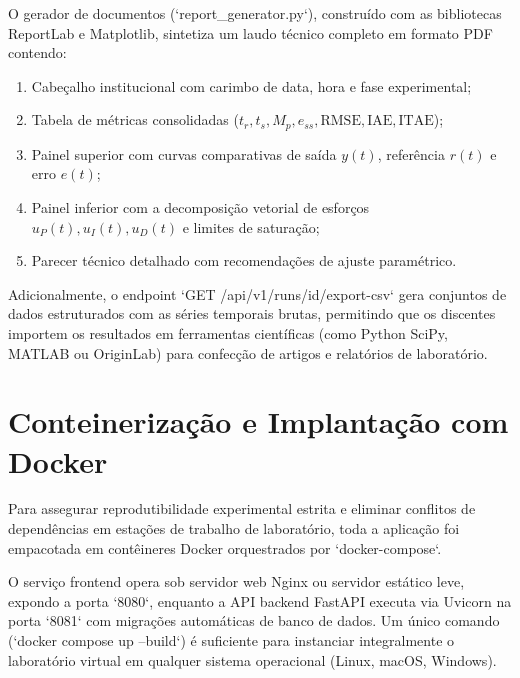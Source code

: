 O gerador de documentos (`report_generator.py`), construído com as bibliotecas ReportLab e Matplotlib, sintetiza um laudo técnico completo em formato PDF contendo:
\begin{enumerate}[label=\alph*)]
    \item Cabeçalho institucional com carimbo de data, hora e fase experimental;
    \item Tabela de métricas consolidadas ($t_r, t_s, M_p, e_{ss}, \text{RMSE}, \text{IAE}, \text{ITAE}$);
    \item Painel superior com curvas comparativas de saída $y(t)$, referência $r(t)$ e erro $e(t)$;
    \item Painel inferior com a decomposição vetorial de esforços $u_P(t), u_I(t), u_D(t)$ e limites de saturação;
    \item Parecer técnico detalhado com recomendações de ajuste paramétrico.
\end{enumerate}

Adicionalmente, o endpoint `GET /api/v1/runs/{id}/export-csv` gera conjuntos de dados estruturados com as séries temporais brutas, permitindo que os discentes importem os resultados em ferramentas científicas (como Python SciPy, MATLAB ou OriginLab) para confecção de artigos e relatórios de laboratório.

\section{Conteinerização e Implantação com Docker}
\label{sec:conteinerizacao}

Para assegurar reprodutibilidade experimental estrita e eliminar conflitos de dependências em estações de trabalho de laboratório, toda a aplicação foi empacotada em contêineres Docker orquestrados por `docker-compose`. 

O serviço frontend opera sob servidor web Nginx ou servidor estático leve, expondo a porta `8080`, enquanto a API backend FastAPI executa via Uvicorn na porta `8081` com migrações automáticas de banco de dados. Um único comando (`docker compose up --build`) é suficiente para instanciar integralmente o laboratório virtual em qualquer sistema operacional (Linux, macOS, Windows).
